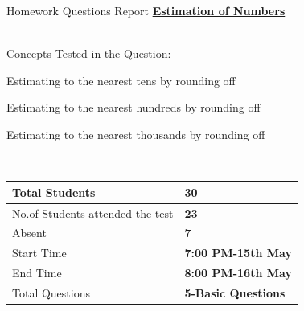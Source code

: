 \documentclass[12pt]{article}
\begin{document}
\begin{center}
   \huge{Homework Questions Report}
   \linebreak%
   \underline{\LARGE\textbf{Estimation of Numbers}} 
\end{center}

\vspace{0.5cm}\\%
Concepts Tested in the Question: 

Estimating to the nearest tens by rounding off

Estimating to the nearest hundreds by rounding off

Estimating to the nearest thousands by rounding off

\vspace{1cm}\\

\begin{tabularx}{0.9\textwidth} { 
  | >{\centering\arraybackslash}X 
  | >{\centering\arraybackslash}X | }
 \hline
 Total Students & \textbf{30}\\
 \hline
 No.of Students attended the test  & \textbf{23}\\
\hline
 Absent & \textbf{7} \\
\hline
 Start Time & \textbf{7:00 PM-15th May} \\
\hline
 End Time & \textbf{8:00 PM-16th May} \\
\hline
 Total Questions & \textbf{5-Basic Questions} \\
\hline
\end{tabularx}
\vspace{0.5cm}\\
\end{document}
